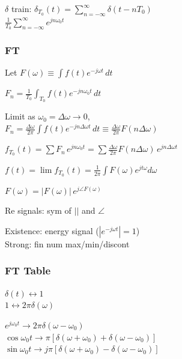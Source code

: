 \documentclass[4pt]{article}
\theoremstyle{definition}
\theoremstyle{definition}
\renewcommand{\o}{\omega}
\newcommand{\ra}{\rightarrow}
\newcommand{\lra}{\leftrightarrow}
\begin{document}
\begin{landscape}
\begin{multicols}{3}
    $\delta$ train:     
        $\delta_{T_0} (t) = \sum_{n=-\infty}^{\infty} \delta(t - nT_0)$ \\
        $\frac{1}{T_0} \sum_{n=-\infty}^{\infty} e^{jn\omega_0 t}$

\subsubsection*{FT}
    Let \(F(\omega) \equiv \int f(t) e^{-j\omega t} \, dt\)

    \(F_n = \frac 1 {T_0} \int_{T_0} f(t) e^{-jn\omega_0 t} \, dt\)

    Limit as $\omega_0 =\Delta\omega \ra 0$,\\
    \(F_n = \frac {\Delta\omega}{2\pi} \int f(t) e^{-jn\Delta\omega t} \, dt
    \equiv \frac{\Delta\omega}{2\pi} F(n\Delta\omega)\) %

    \(f_{T_0}(t) = \sum F_n\, e^{jn\omega_0 t} = \sum \frac {\Delta\omega} {2\pi} F(n\Delta\omega)\,  e^{jn\Delta\omega t}\)

    \(f(t) = \lim f_{T_0} (t) = \frac{1}{2\pi}\int F(\omega) e^{jt\omega} d\omega\)

    \(F(\omega) = |F(\omega)| \, e^{j\angle F(\omega)}\)

    Re signals: sym of $||$ and $\angle$

    Existence: energy signal ($|e^{-j\o t}| = 1$)\\
    Strong: fin num max/min/discont

\subsubsection*{FT Table}

    \(\delta(t) \lra 1\)\\
    $1 \lra 2\pi\delta(\omega)$

    \(e^{j\o_0 t}\ra 2\pi\delta(\o - \o_0)\)\\         %
    \(\cos \o_0 t\ra \pi[\delta(\o+\o_0) + \delta(\o - \o_0)]\)\\
    \(\sin \o_0 t\ra j\pi[\delta(\o + \o_0) - \delta(\o - \o_0)]\)


\end{multicols}
\end{landscape}
\end{document}
